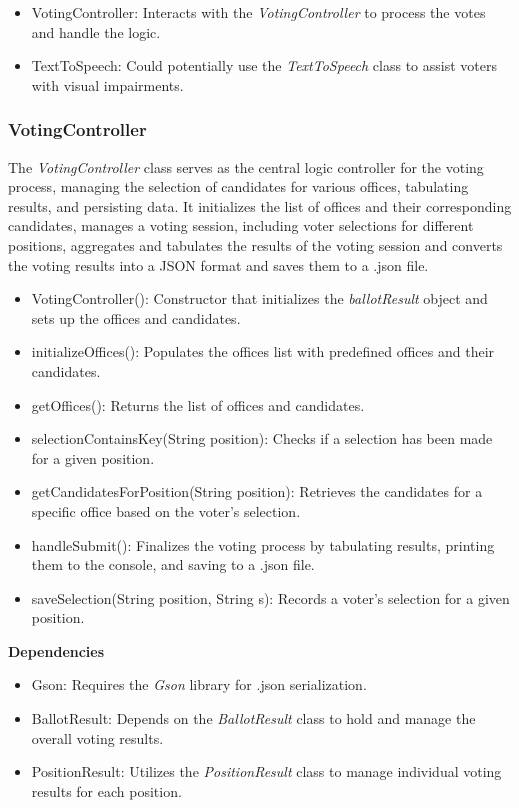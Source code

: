 \documentclass{article}
\begin{document}
\begin{itemize}
    \item VotingController: Interacts with the \textit{VotingController} to process the votes and handle the logic.
    \item TextToSpeech: Could potentially use the \textit{TextToSpeech} class to assist voters with visual impairments.
\end{itemize}

\subsubsection{VotingController}
The \textit{VotingController} class serves as the central logic controller for the voting process, managing the selection of candidates for various offices, tabulating results, and persisting data. It initializes the list of offices and their corresponding candidates, manages a voting session, including voter selections for different positions, aggregates and tabulates the results of the voting session and converts the voting results into a JSON format and saves them to a .json file.

\begin{itemize}
    \item VotingController(): Constructor that initializes the \textit{ballotResult} object and sets up the offices and candidates.
    \item initializeOffices(): Populates the offices list with predefined offices and their candidates.
    \item getOffices(): Returns the list of offices and candidates.
    \item selectionContainsKey(String position): Checks if a selection has been made for a given position.
    \item getCandidatesForPosition(String position): Retrieves the candidates for a specific office based on the voter’s selection.
    \item handleSubmit(): Finalizes the voting process by tabulating results, printing them to the console, and saving to a .json file.
    \item saveSelection(String position, String s): Records a voter’s selection for a given position.
\end{itemize}
\textbf{Dependencies}

\begin{itemize}
    \item Gson: Requires the \textit{Gson} library for .json serialization.
    \item BallotResult: Depends on the \textit{BallotResult} class to hold and manage the overall voting results.
    \item PositionResult: Utilizes the \textit{PositionResult} class to manage individual voting results for each position.
\end{itemize}
\end{document}
